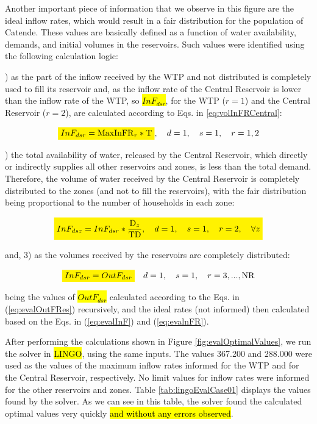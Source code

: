 \documentclass{singlecol}
\newcommand{\mathcolorbox}[2]{\colorbox{#1}{$\displaystyle #2$}}
\theoremstyle{TH}{
\newtheorem{lemma}{Lemma}
\newtheorem{theorem}[lemma]{Theorem}
\newtheorem{corrolary}[lemma]{Corrolary}
\newtheorem{conjecture}[lemma]{Conjecture}
\newtheorem{proposition}[lemma]{Proposition}
\newtheorem{claim}[lemma]{Claim}
\newtheorem{stheorem}[lemma]{Wrong Theorem}
\newtheorem{algorithm}{Algorithm}
}
\theoremstyle{THrm}{
\newtheorem{definition}{Definition}[section]
\newtheorem{question}{Question}[section]
\newtheorem{remark}{Remark}
\newtheorem{scheme}{Scheme}
}
\theoremstyle{THhit}{
\newtheorem{case}{Case}[section]
}
\begin{document}
Another important piece of information that we observe in this figure are the ideal inflow rates, which would result in a fair distribution for the population of Catende. These values are basically defined as a function of water availability, demands, and initial volumes in the reservoirs. Such values were identified using the following calculation logic:

) as the part of the inflow received by the WTP and not distributed is completely used to fill its reservoir and, as the inflow rate of the Central Reservoir is lower than the inflow rate of the WTP, so \hl{$InF_{dsr}$}, for the WTP ($r=1$) and the Central Reservoir  ($r=2$), are calculated according to Eqs. in \ref{eq:volInFRCentral}: 

\begin{equation}
	\mathcolorbox{yellow}{InF_{dsr} = \mathrm{MaxInFR}_r * \mathrm{T}}, \quad d = 1, \quad s = 1, \quad r = 1,2
	\label{eq:volInFRCentral}
\end{equation}

) the total availability of water, released by the Central Reservoir, which directly or indirectly supplies all other reservoirs and zones, is less than the total demand. Therefore, the volume of water received by the Central Reservoir is completely distributed to the zones (and not to fill the reservoirs), with the fair distribution being proportional to the number of households in each zone: 

\begin{equation}
	\mathcolorbox{yellow}{InF_{dsz} = InF_{dsr} * \dfrac{\mathrm{D}_z}{ \mathrm{TD}},
	\quad d = 1, \quad s = 1, \quad r = 2, \quad \forall z}  
\end{equation}

\noindent and, 3) as the volumes received by the reservoirs are completely distributed: 

\begin{equation}
	\mathcolorbox{yellow}{InF_{dsr} = OutF_{dsr}} \quad d = 1, \quad s = 1, \quad r=3, ..., \mathrm{NR}
\end{equation}

\noindent being the values of \hl{$OutF_{dsr}$} calculated according to the Eqs. in (\ref{eq:evalOutFRes}) recursively, and the ideal rates (not informed) then calculated based on the Eqs. in (\ref{eq:evalInF}) and (\ref{eq:evalnFR}).

After performing the calculations shown in Figure \ref{fig:evalOptimalValues}, we run the solver in \hl{LINGO}, using the same inputs. The values 367.200 and 288.000 were used as the values of the maximum inflow rates informed for the WTP and for the Central Reservoir, respectively. No limit values for inflow rates were informed for the other reservoirs and zones. Table \ref{tab:lingoEvalCase01} displays the values found by the solver. As we can see in this table, the solver found the calculated optimal values very quickly \hl{and without any errors observed}. 
\end{document}
